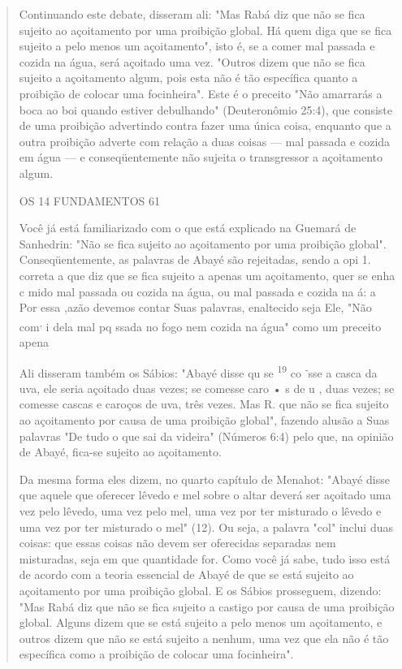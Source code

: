 \begin{quote}
Continuando este debate, disseram ali: "Mas Rabá diz que não se fi­ca
sujeito ao açoitamento por uma proibição global. Há quem diga que se
fica sujeito a pelo menos um açoitamento", isto é, se a comer mal
passada e cozida na água, será açoitado uma vez. "Outros dizem que não
se fica sujeito a açoita­mento algum, pois esta não é tão específica
quanto a proibição de colocar uma focinheira". Este é o preceito "Não
amarrarás a boca ao boi quando estiver de­bulhando" (Deuteronômio 25:4),
que consiste de uma proibição advertindo con­tra fazer uma única coisa,
enquanto que a outra proibição adverte com relação a duas coisas --- mal
passada e cozida em água --- e conseqüentemente não su­jeita o
transgressor a açoitamento algum.

OS 14 FUNDAMENTOS 61

Você já está familiarizado com o que está explicado na Guemará de
Sanhedrin: "Não se fica sujeito ao açoitamento por uma proibição
global". Con­seqüentemente, as palavras de Abayé são rejeitadas, sendo a
opi 1. correta a que diz que se fica sujeito a apenas um açoitamento,
quer se enha c mido mal passada ou cozida na água, ou mal passada e
cozida na á: a Por essa ,azão devemos contar Suas palavras, enaltecido
seja Ele, "Não com\textsuperscript{,} i dela mal pq ssa­da no fogo nem
cozida na água" como um preceito apena

Ali disseram também os Sábios: "Abayé disse qu se \textsuperscript{19}
co \textsuperscript{-}sse a casca da uva, ele seria açoitado duas vezes;
se comesse caro • s de u , duas vezes; se comesse cascas e caroços de
uva, três vezes. Mas R. que não se fica sujeito ao açoitamento por causa
de uma proibição global", fazendo alu­são a Suas palavras "De tudo o que
sai da videira" (Números 6:4) pelo que, na opinião de Abayé, fica-se
sujeito ao açoitamento.

Da mesma forma eles dizem, no quarto capítulo de Menahot: "Aba­yé disse
que aquele que oferecer lêvedo e mel sobre o altar deverá ser açoitado
uma vez pelo lêvedo, uma vez pelo mel, uma vez por ter misturado o
lêvedo e uma vez por ter misturado o mel" (12). Ou seja, a palavra "col"
inclui duas coisas: que essas coisas não devem ser oferecidas separadas
nem misturadas, seja em que quantidade for. Como você já sabe, tudo isso
está de acordo com a teoria essencial de Abayé de que se está sujeito ao
açoitamento por uma proi­bição global. E os Sábios prosseguem, dizendo:
"Mas Rabá diz que não se fica sujeito a castigo por causa de uma
proibição global. Alguns dizem que se está sujeito a pelo menos um
açoitamento, e outros dizem que não se está sujeito a nenhum, uma vez
que ela não é tão específica como a proibição de colocar uma
focinheira".


\end{quote}
